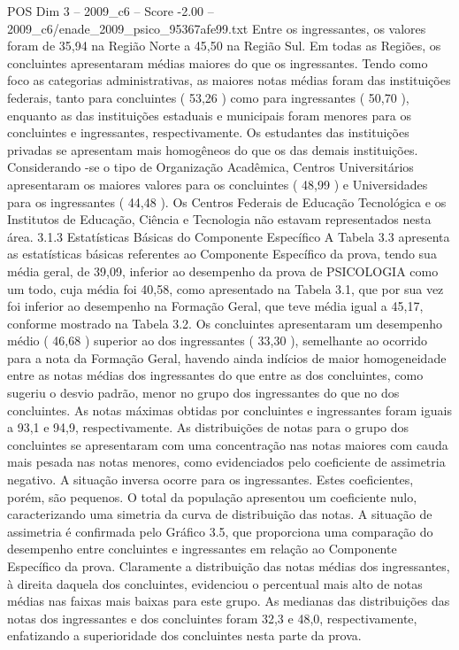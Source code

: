 \begin{textsample}{POS Dim 3 – 2009\_c6 – Score -2.00 – 2009\_c6/enade\_2009\_psico\_95367afe99.txt}
Entre os ingressantes, os valores foram de 35,94 na Região Norte a 45,50 na Região Sul.
Em todas as Regiões, os concluintes apresentaram médias maiores do que os ingressantes.
Tendo como foco as categorias administrativas, as maiores notas médias foram das instituições federais, tanto para concluintes ( 53,26 ) como para ingressantes ( 50,70 ), enquanto as das instituições estaduais e municipais foram menores para os concluintes e ingressantes, respectivamente.
Os estudantes das instituições privadas se apresentam mais homogêneos do que os das demais instituições.
Considerando -se o tipo de Organização Acadêmica, Centros Universitários apresentaram os maiores valores para os concluintes ( 48,99 ) e Universidades para os ingressantes ( 44,48 ).
Os Centros Federais de Educação Tecnológica e os Institutos de Educação, Ciência e Tecnologia não estavam representados nesta área. 3.1.3 Estatísticas Básicas do Componente Específico A Tabela 3.3 apresenta as estatísticas básicas referentes ao Componente Específico da prova, tendo sua média geral, de 39,09, inferior ao desempenho da prova de PSICOLOGIA como um todo, cuja média foi 40,58, como apresentado na Tabela 3.1, que por sua vez foi inferior ao desempenho na Formação Geral, que teve média igual a 45,17, conforme mostrado na Tabela 3.2.
Os concluintes apresentaram um desempenho médio ( 46,68 ) superior ao dos ingressantes ( 33,30 ), semelhante ao ocorrido para a nota da Formação Geral, havendo ainda indícios de maior homogeneidade entre as notas médias dos ingressantes do que entre as dos concluintes, como sugeriu o desvio padrão, menor no grupo dos ingressantes do que no dos concluintes.
As notas máximas obtidas por concluintes e ingressantes foram iguais a 93,1 e 94,9, respectivamente.
As distribuições de notas para o grupo dos concluintes se apresentaram com uma concentração nas notas maiores com cauda mais pesada nas notas menores, como evidenciados pelo coeficiente de assimetria negativo.
A situação inversa ocorre para os ingressantes.
Estes coeficientes, porém, são pequenos.
O total da população apresentou um coeficiente nulo, caracterizando uma simetria da curva de distribuição das notas.
A situação de assimetria é confirmada pelo Gráfico 3.5, que proporciona uma comparação do desempenho entre concluintes e ingressantes em relação ao Componente Específico da prova.
Claramente a distribuição das notas médias dos ingressantes, à direita daquela dos concluintes, evidenciou o percentual mais alto de notas médias nas faixas mais baixas para este grupo.
As medianas das distribuições das notas dos ingressantes e dos concluintes foram 32,3 e 48,0, respectivamente, enfatizando a superioridade dos concluintes nesta parte da prova.

\end{textsample}
